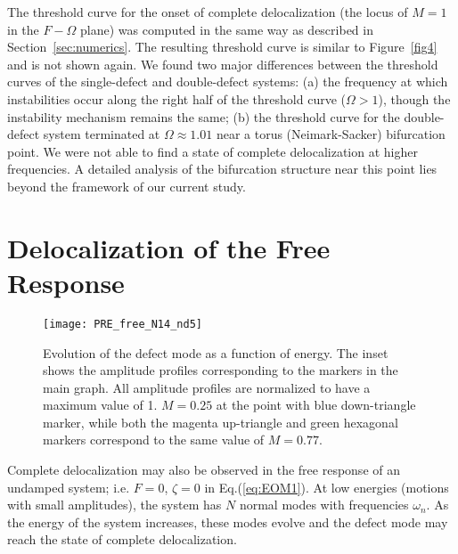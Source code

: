\documentclass[aps,pre,twocolumn,groupedaddress]{revtex4-1}
\begin{document}
The threshold curve for the onset of complete delocalization (the locus of $M=1$ in the $F-\Omega$ plane) was computed in the same way as described in Section~\ref{sec:numerics}. The resulting threshold curve is similar to Figure~\ref{fig4} and is not shown again. We found two major differences between the threshold curves of the single-defect and double-defect systems: (a) the frequency at which instabilities occur along the right half of the threshold curve ($\Omega>1$), though the instability mechanism remains the same; (b) the threshold curve for the double-defect system terminated at $\Omega \approx 1.01$ near a torus (Neimark-Sacker) bifurcation point. We were not able to find a state of complete delocalization at higher frequencies. 
A detailed analysis of the bifurcation structure near this point lies beyond the framework of our current study. 



















\section{Delocalization of the Free Response}
\label{sec:free}

\begin{figure}[bt]
	\texttt{[image: PRE\_free\_N14\_nd5]}%
	\caption{
		\label{fig:free} 
		Evolution of the defect mode as a function of energy. The inset shows the amplitude profiles corresponding to the markers in the main graph. All amplitude profiles are normalized to have a maximum value of 1. $M=0.25$ at the point with blue down-triangle marker, while both the magenta up-triangle and green hexagonal markers correspond to the same value of $M=0.77$. 
	}
\end{figure}

Complete delocalization may also be observed in the free response of an undamped system; i.e. $F=0$, $\zeta=0$ in Eq.(\ref{eq:EOM1}). At low energies (motions with small amplitudes), the system has $N$ normal modes with frequencies $\omega_n$. As the energy of the system increases, these modes evolve and the defect mode may reach the state of complete delocalization. 
\end{document}
